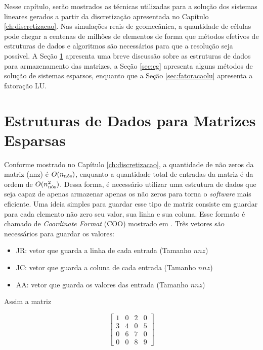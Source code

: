 

Nesse capítulo, serão mostrados as técnicas utilizadas para a solução dos sistemas lineares gerados a partir da discretização apresentada no Capítulo \ref{ch:discretizacao}. Nas simulações reais de geomecânica, a quantidade de células pode chegar a centenas de milhões de elementos de forma que métodos efetivos de estruturas de dados e algoritmos são necessários para que a resolução seja possível. A Seção \ref{sec:csr} apresenta uma breve discussão sobre as estruturas de dados para armazenamento das matrizes, a Seção \ref{sec:cg} apresenta alguns métodos de solução de sistemas esparsos, enquanto que a Seção \ref{sec:fatoracaolu} apresenta a fatoração LU.


\section{Estruturas de Dados para Matrizes Esparsas} \label{sec:csr}

Conforme mostrado no Capítulo \ref{ch:discretizacao}, a quantidade de não zeros da matriz (nnz) é $O(\qtdnos)$, enquanto a quantidade total de entradas da matriz é da ordem de $O(\qtdnos^2)$. Dessa forma, é necessário utilizar uma estrutura de dados que seja capaz de apenas armazenar apenas os não zeros para torna o \textit{software} mais eficiente.  Uma ideia simples para guardar esse tipo de matriz consiste em guardar para cada elemento não zero seu valor, sua linha e sua coluna. Esse formato é chamado de \textit{Coordinate Format} (COO) mostrado em \citet{solverlinear}. Três vetores são necessários para guardar os valores:


\begin{itemize}
    \item JR: vetor que guarda a linha de cada entrada (Tamanho $nnz$)
    \item JC: vetor que guarda a coluna de cada entrada (Tamanho $nnz$)
    \item AA: vetor que guarda os valores das entrada (Tamanho $nnz$)
\end{itemize}


Assim a matriz


\begin{equation}
    \begin{bmatrix}
        1 & 0 & 2 & 0\\
        3 & 4 & 0 & 5\\
        0 & 6 & 7 & 0\\
        0 & 0 & 8 &9
    \end{bmatrix}
\end{equation}

